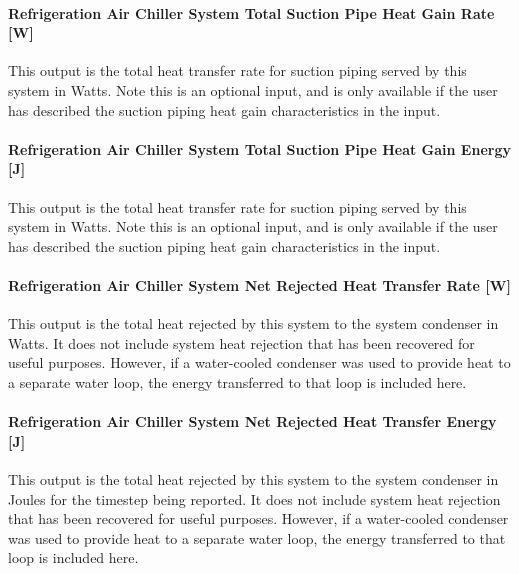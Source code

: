 \paragraph{Refrigeration Air Chiller System Total Suction Pipe Heat Gain Rate {[}W{]}}\label{refrigeration-air-chiller-system-total-suction-pipe-heat-gain-rate-w}

This output is the total heat transfer rate for suction piping served by this system in Watts. Note this is an optional input, and is only available if the user has described the suction piping heat gain characteristics in the input.

\paragraph{Refrigeration Air Chiller System Total Suction Pipe Heat Gain Energy {[}J{]}}\label{refrigeration-air-chiller-system-total-suction-pipe-heat-gain-energy-j}

This output is the total heat transfer rate for suction piping served by this system in Watts. Note this is an optional input, and is only available if the user has described the suction piping heat gain characteristics in the input.

\paragraph{Refrigeration Air Chiller System Net Rejected Heat Transfer Rate {[}W{]}}\label{refrigeration-air-chiller-system-net-rejected-heat-transfer-rate-w}

This output is the total heat rejected by this system to the system condenser in Watts. It does not include system heat rejection that has been recovered for useful purposes. However, if a water-cooled condenser was used to provide heat to a separate water loop, the energy transferred to that loop is included here.

\paragraph{Refrigeration Air Chiller System Net Rejected Heat Transfer Energy {[}J{]}}\label{refrigeration-air-chiller-system-net-rejected-heat-transfer-energy-j}

This output is the total heat rejected by this system to the system condenser in Joules for the timestep being reported. It does not include system heat rejection that has been recovered for useful purposes. However, if a water-cooled condenser was used to provide heat to a separate water loop, the energy transferred to that loop is included here.

